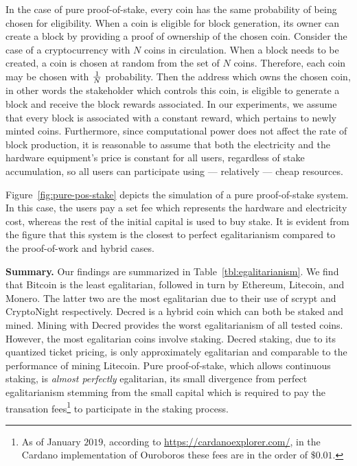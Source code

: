 In the case of pure proof-of-stake, every coin has the same probability of
being chosen for eligibility. When a coin is eligible for block generation, its
owner can create a block by providing a proof of ownership of the chosen coin.
Consider the case of a cryptocurrency with $N$ coins in circulation. When a
block needs to be created, a coin is chosen at random from the set of $N$
coins. Therefore, each coin may be chosen with $1 \over N$ probability. Then
the address which owns the chosen coin, in other words the stakeholder which
controls this coin, is eligible to generate a block and receive the block
rewards associated. In our experiments, we assume that every block is
associated with a constant reward, which pertains to newly minted coins.
Furthermore, since computational power does not affect the rate of block
production, it is reasonable to assume that both the electricity and the
hardware equipment's price is constant for all users, regardless of stake
accumulation, so all users can participate using --- relatively --- cheap
resources.

Figure~\ref{fig:pure-pos-stake} depicts the simulation of a pure proof-of-stake
system. In this case, the users pay a set fee which represents the hardware and
electricity cost, whereas the rest of the initial capital is used to buy stake.
It is evident from the figure that this system is the closest to perfect
egalitarianism compared to the proof-of-work and hybrid cases.

\noindent\textbf{Summary.}
\noindent
Our findings are summarized in Table~\ref{tbl:egalitarianism}. We find that
Bitcoin is the least egalitarian, followed in turn by Ethereum, Litecoin, and
Monero.
The latter two are the most egalitarian due to their use of scrypt and
CryptoNight respectively. Decred is a hybrid coin which can both be staked and
mined. Mining with Decred provides the worst egalitarianism of all tested
coins.  However, the most egalitarian coins involve staking. Decred staking, due
to its quantized ticket pricing, is only approximately egalitarian and comparable
to the performance of mining Litecoin. Pure
proof-of-stake, which allows continuous staking, is \emph{almost perfectly}
egalitarian, its small divergence from perfect egalitarianism stemming from the
small capital which is required to pay the transation fees\footnote{As of
January $2019$, according to \url{https://cardanoexplorer.com/}, in the Cardano
implementation of Ouroboros these fees are in the order of $\$0.01$.} to
participate in the staking process.

